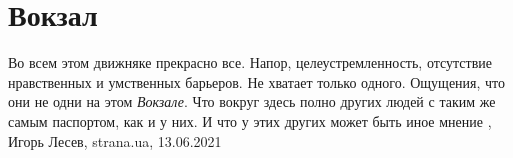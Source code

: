 
 
 
 
 
\chapter{Вокзал}
\label{sec:slova.vokzal}

Во всем этом движняке прекрасно все. Напор, целеустремленность, отсутствие
нравственных и умственных барьеров. Не хватает только одного. Ощущения, что они
не одни на этом \emph{Вокзале}. Что вокруг здесь полно других людей с таким же
самым паспортом, как и у них. И что у этих других может быть иное мнение
, 
Игорь Лесев, strana.ua, 13.06.2021

